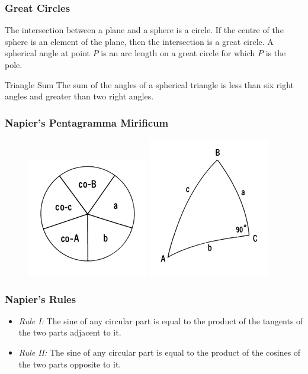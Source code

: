 \documentclass[xcolor=dvipsnames]{beamer}
\begin{document}
\begin{frame}
  \frametitle{Great Circles}
The intersection between a plane and a sphere is a circle. If the
centre of the sphere is an element of the plane, then the intersection
is a \alert{great circle}. A \alert{spherical angle} at point $P$ is
an arc length on a great circle for which $P$ is the pole.
\begin{block}{Triangle Sum}
  The sum of the angles of a spherical triangle is less than six right
  angles and greater than two right angles.
\end{block}
\end{frame}

\begin{frame}
  \frametitle{Napier's Pentagramma Mirificum}
\begin{figure} 
\centering 
\begin{minipage}{0.45\textwidth} 
\centering
    \includegraphics[scale=.8]{./nap1.png}
\end{minipage}\hfill 
\begin{minipage}{0.45\textwidth} 
\centering 
    \includegraphics[scale=.8]{./nap2.png}
\end{minipage} 
\end{figure} 
\end{frame}

\begin{frame}
  \frametitle{Napier's Rules}
  \begin{itemize}
  \item \emph{Rule I:} The sine of any circular part is equal to the
    product of the tangents of the two parts adjacent to it.
  \item \emph{Rule II:} The sine of any circular part is equal to the
    product of the cosines of the two parts opposite to it.
  \end{itemize}
\end{frame}
\end{document}

